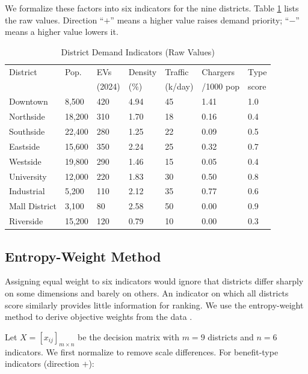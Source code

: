 \documentclass[12pt]{article}
\begin{document}
We formalize these factors into six indicators for the nine districts. Table
\ref{tab:indicators} lists the raw values. Direction ``$+$'' means a higher value raises
demand priority; ``$-$'' means a higher value lowers it.

\begin{table}[H]
\centering
\caption{District Demand Indicators (Raw Values)}
\label{tab:indicators}
\renewcommand{\arraystretch}{0.95}
\begin{tabular}{@{}p{}p{}p{}p{}p{}p{}p{}@{}}
\toprule
District & Pop. & EVs & Density & Traffic & Chargers & Type \\
 & & (2024) & (\%) & (k/day) & /1000 pop & score \\
\midrule
Downtown & 8,500 & 420 & 4.94 & 45 & 1.41 & 1.0 \\
Northside & 18,200 & 310 & 1.70 & 18 & 0.16 & 0.4 \\
Southside & 22,400 & 280 & 1.25 & 22 & 0.09 & 0.5 \\
Eastside & 15,600 & 350 & 2.24 & 25 & 0.32 & 0.7 \\
Westside & 19,800 & 290 & 1.46 & 15 & 0.05 & 0.4 \\
University & 12,000 & 220 & 1.83 & 30 & 0.50 & 0.8 \\
Industrial & 5,200 & 110 & 2.12 & 35 & 0.77 & 0.6 \\
Mall District & 3,100 & 80 & 2.58 & 50 & 0.00 & 0.9 \\
Riverside & 15,200 & 120 & 0.79 & 10 & 0.00 & 0.3 \\
\bottomrule
\end{tabular}
\end{table}

\subsection{Entropy-Weight Method}

Assigning equal weight to six indicators would ignore that districts differ sharply on
some dimensions and barely on others. An indicator on which all districts score similarly
provides little information for ranking. We use the entropy-weight method to derive
objective weights from the data \cite{Shannon1948}.

Let $X = [x_{ij}]_{m \times n}$ be the decision matrix with $m = 9$ districts and $n = 6$
indicators. We first normalize to remove scale differences. For benefit-type indicators
(direction $+$):
\end{document}
